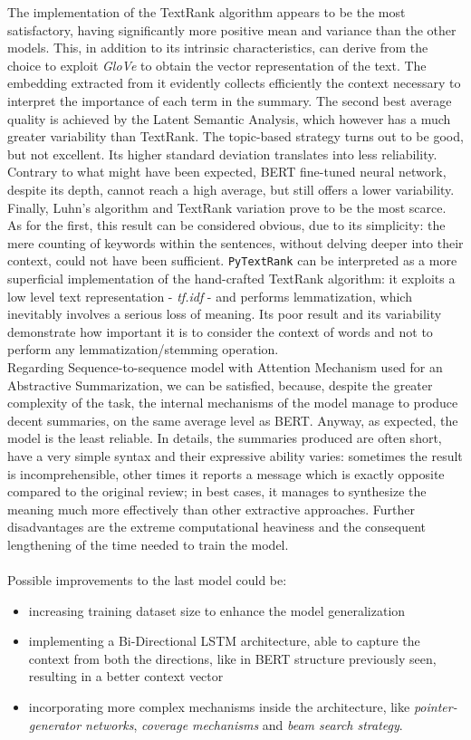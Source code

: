 \documentclass[fleqn,10pt]{SelfArx} %
\begin{document}
The implementation of the TextRank algorithm appears to be the most satisfactory, having significantly more positive mean and variance than the other models. This, in addition to its intrinsic characteristics, can derive from the choice to exploit \textit{GloVe} to obtain the vector representation of the text. The embedding extracted from it evidently collects efficiently the context necessary to interpret the importance of each term in the summary. The second best average quality is achieved by the Latent Semantic Analysis, which however has a much greater variability than TextRank. The topic-based strategy turns out to be good, but not excellent. Its higher standard deviation translates into less reliability. Contrary to what might have been expected, BERT fine-tuned neural network, despite its depth, cannot reach a high average, but still offers a lower variability. Finally, Luhn's algorithm and TextRank variation prove to be the most scarce. As for the first, this result can be considered obvious, due to its simplicity: the mere counting of keywords within the sentences, without delving deeper into their context, could not have been sufficient. \texttt{PyTextRank} can be interpreted as a more superficial implementation of the hand-crafted TextRank algorithm: it exploits a low level text representation - \textit{tf.idf} - and performs lemmatization, which inevitably involves a serious loss of meaning. Its poor result and its variability demonstrate how important it is to consider the context of words and not to perform any lemmatization/stemming operation.\\
Regarding Sequence-to-sequence model with Attention Mechanism used for an Abstractive Summarization, we can be satisfied, because, despite the greater complexity of the task, the internal mechanisms of the model manage to produce decent summaries, on the same average level as BERT. Anyway, as expected, the model is the least reliable. In details, the summaries produced are often short, have a very simple syntax and their expressive ability varies: sometimes the result is incomprehensible, other times it reports a message which is exactly opposite compared to the original review; in best cases, it manages to synthesize the meaning much more effectively than other extractive approaches.
Further disadvantages are the extreme computational heaviness and the consequent lengthening of the time needed to train the model.\\
\\
Possible improvements to the last model could be:
\begin{itemize}
    \item increasing training dataset size to enhance the model generalization
    \item implementing a Bi-Directional LSTM architecture, able to capture the context from both the directions, like in BERT structure previously seen, resulting in a better context vector
    \item incorporating more complex mechanisms inside the architecture, like \textit{pointer-generator networks}, \textit{coverage mechanisms} and \textit{beam search strategy}.
\end{itemize}
\end{document}
